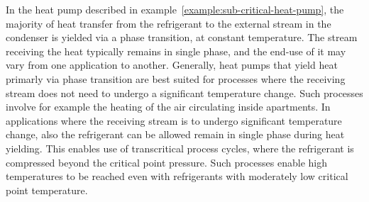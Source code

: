In the heat pump described in example~\ref{example:sub-critical-heat-pump}, the majority of heat transfer from the refrigerant to the external stream in the condenser is yielded via a phase transition, at constant temperature. The stream receiving the heat typically remains in single phase, and the end-use of it may vary from one application to another. Generally, heat pumps that yield heat primarly via phase transition are best suited for processes where the receiving stream does not need to undergo a significant temperature change. Such processes involve for example the heating of the air circulating inside apartments. In applications where the receiving stream is to undergo significant temperature change, also the refrigerant can be allowed remain in single phase during heat yielding. This enables use of transcritical process cycles, where the refrigerant is compressed beyond the critical point pressure. Such processes enable high temperatures to be reached even with refrigerants with moderately low critical point temperature.

